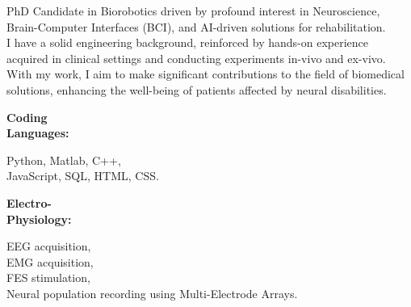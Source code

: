 \documentclass[9pt]{developercv} %
\begin{document}

\begin{minipage}[t]{0.55\textwidth}
	\vspace{-6pt}
 
    PhD Candidate in Biorobotics driven by profound interest in Neuroscience, Brain-Computer Interfaces (BCI), and AI-driven solutions for rehabilitation.\\
    I have a solid engineering background, reinforced by hands-on experience acquired in clinical settings and conducting experiments in-vivo and ex-vivo. With my work, I aim to make significant contributions to the field of biomedical solutions, enhancing the well-being of patients affected by neural disabilities.
	
\end{minipage}
\hfill %
\begin{minipage}[t]{0.405\textwidth}
    \vspace{-6pt}
    
    \begin{minipage}[t]{0.27\textwidth}
        \textbf{Coding \\ Languages:}
    \end{minipage}
    \hfill
    \begin{minipage}[t]{0.70\textwidth}
      Python, Matlab, C++, \\ JavaScript, SQL, HTML, CSS.
    \end{minipage}
    \vspace{4mm}
    
    \begin{minipage}[t]{0.27\textwidth}
        \textbf{Electro-\\ Physiology:}
    \end{minipage}
    \hfill
    \begin{minipage}[t]{0.70\textwidth}
      EEG acquisition,\\ EMG acquisition,\\ FES stimulation,\\ Neural population recording using Multi-Electrode Arrays.
    \end{minipage}
    
\end{minipage}
\end{document}
